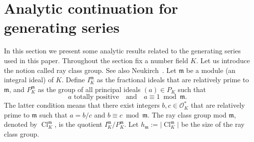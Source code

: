 \documentclass{amsart}
\numberwithin{equation}{section}
\theoremstyle{plain}
\theoremstyle{definition}
\theoremstyle{remark}
\begin{document}
\section{Analytic continuation for generating series}\label{sec: generating series}
In this section we present some analytic results related to the generating series used in this paper.
Throughout the section fix a number field $K$.
Let us introduce the notion called ray class group.
See also Neukirch~\cite[VI.1.7]{neukirch2013algebraic}.
Let $\mathfrak{m}$ be a module (an integral ideal) of $K$.
Define $I_K^{\mathfrak{m}}$ as the fractional ideals that are relatively prime to $\mathfrak{m}$, and $P_K^{\mathfrak{m}}$ as the group of all principal ideals $(a)\in P_K$ such that
\begin{equation*}
	a\text{ totally positive}\quad\text{and}\quad a\equiv1\bmod{\mathfrak{m}}.
\end{equation*}
The latter condition means that there exist integers $b,c\in\mathscr{O}_K^*$ that are relatively prime to $\mathfrak{m}$ such that $a=b/c$ and $b\equiv c\bmod{\mathfrak{m}}$.
The ray class group mod $\mathfrak{m}$, denoted by $\operatorname{Cl}_K^{\mathfrak{m}}$, is the quotient $I_K^{\mathfrak{m}}/P_K^{\mathfrak{m}}$.
Let $h_{\mathfrak{m}}:=\lvert\operatorname{Cl}_K^{\mathfrak{m}}\rvert$ be the size of the ray class group.
\end{document}
